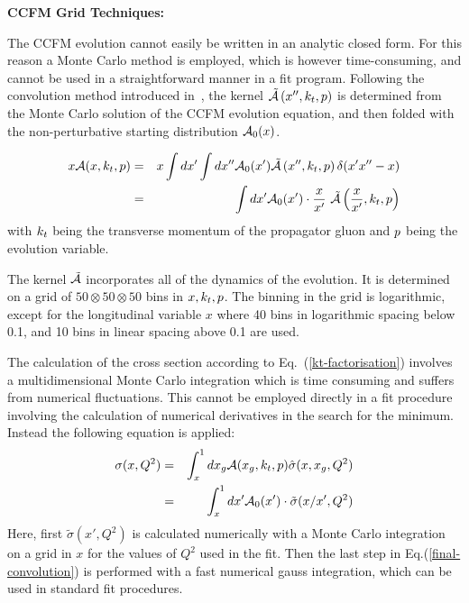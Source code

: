 \begin{description}
\vspace{0.1cm}
\item \bf {CCFM Grid Techniques:} \rm

The CCFM evolution cannot easily be written in an analytic closed form. For this 
reason a Monte Carlo method is employed, which is however time-consuming, and 
cannot be used in a straightforward manner in a fit program. 
Following the  convolution method introduced in~\cite{Jung:2012hy,Hautmann:2013tba}, the 
kernel $ \tilde {\cal A}\left(x'',\kt,\Pmax\right) $ is determined from the Monte Carlo  solution of the CCFM evolution equation, 
and then folded with the non-perturbative starting distribution ${\cal A}_0 (x)$.

{\small{ 
\begin{eqnarray}
x {\cal A}(x,\kt,\Pmax) &= &x\int dx' \int dx'' {\cal A}_0 (x') \tilde{\cal A}\left(x'',\kt,\Pmax\right) 
 \delta(x' 
x'' - x) 
\nonumber  
\\
& = & \int dx' {{\cal A}_0 (x') }  
\cdot \frac{x}{x'} \ { \tilde{\cal A}\left(\frac{x}{x'},\kt,\Pmax\right) } 
\end{eqnarray}
}}
with $k_t$ being the transverse momentum of the propagator gluon and $p$ being the 
evolution variable.

The kernel $\tilde{\cal A}$ incorporates all of  the dynamics of the evolution.  
It is determined on a grid of $50\otimes50\otimes50$ bins in $ x, k_t, p$.  
The binning in the grid is logarithmic, except for the longitudinal variable 
$x$ where 40 bins in logarithmic 
spacing below 0.1, and 10 bins in linear spacing above 0.1 are used.

The calculation of the cross section according to Eq.~(\ref{kt-factorisation}) involves a 
multidimensional Monte Carlo integration which is time consuming and suffers from numerical fluctuations.  
This cannot be employed directly in a fit procedure involving the calculation of numerical derivatives 
in the search for the minimum. Instead the following equation is applied:
\begin{eqnarray}
\sigma(x,Q^2) & = & \int_x^1 d x_g {\cal A}(x_g,\kt,\Pmax) \hat{ \sigma}(x,x_g,Q^2) 
\nonumber\\
  & = & \int_x^1 dx' {\cal A}_0 (x') \cdot \tilde{ \sigma}(x/x',Q^2) \label{final-convolution}
 \end{eqnarray}
Here, first $ \tilde{ \sigma}(x',Q^2)$ is calculated numerically with a Monte Carlo integration 
on a grid in $x$ for the values of $Q^2$ used in the fit. Then the last step in Eq.(\ref{final-convolution})  
is performed with a fast numerical gauss integration, which can be used in standard fit procedures.


\end{description}
